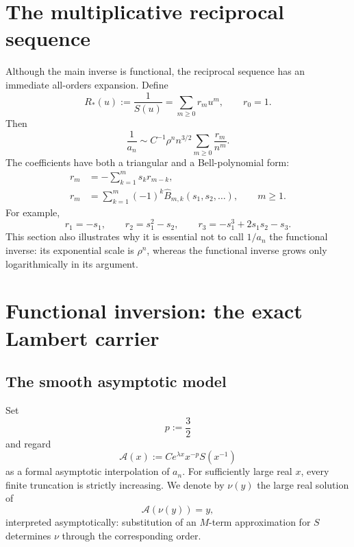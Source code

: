 \documentclass[11pt,oneside]{article}
\numberwithin{equation}{section}
\theoremstyle{plain}
\theoremstyle{definition}
\theoremstyle{remark}
\newcommand{\Bhat}{\widehat{B}}
\begin{document}
\section{The multiplicative reciprocal sequence}\label{sec:reciprocal}

Although the main inverse is functional, the reciprocal sequence has an
immediate all-orders expansion.  Define
\begin{equation}\label{eq:reciprocal-series}
 R_{\!*}(u):=\frac1{S(u)}=\sum_{m\ge0}r_mu^m,
 \qquad r_0=1.
\end{equation}
Then
\begin{equation}\label{eq:reciprocal-asymptotic}
 \boxed{
 \frac1{a_n}\sim C^{-1}\rho^n n^{3/2}
 \sum_{m\ge0}\frac{r_m}{n^m}.}
\end{equation}
The coefficients have both a triangular and a Bell-polynomial form:
\begin{align}
 r_m&=-\sum_{k=1}^{m}s_kr_{m-k},\label{eq:r-recurrence}\\
 r_m&=\sum_{k=1}^{m}(-1)^k
 \Bhat_{m,k}(s_1,s_2,\ldots),\qquad m\ge1.
 \label{eq:r-bell}
\end{align}
For example,
\[
 r_1=-s_1,
 \qquad r_2=s_1^2-s_2,
 \qquad r_3=-s_1^3+2s_1s_2-s_3.
\]
This section also illustrates why it is essential not to call $1/a_n$ the
functional inverse: its exponential scale is $\rho^n$, whereas the
functional inverse grows only logarithmically in its argument.

\section{Functional inversion: the exact Lambert carrier}\label{sec:inverse-carrier}

\subsection{The smooth asymptotic model}

Set
\begin{equation}\label{eq:p-def}
 p:=\frac32
\end{equation}
and regard
\begin{equation}\label{eq:A-model}
 \mathcal A(x):=C e^{\lambda x}x^{-p}S(x^{-1})
\end{equation}
as a formal asymptotic interpolation of $a_n$.  For sufficiently large real
$x$, every finite truncation is strictly increasing.  We denote by
$\nu(y)$ the large real solution of
\begin{equation}\label{eq:inverse-def}
 \mathcal A(\nu(y))=y,
\end{equation}
interpreted asymptotically: substitution of an $M$-term approximation for
$S$ determines $\nu$ through the corresponding order.
\end{document}

